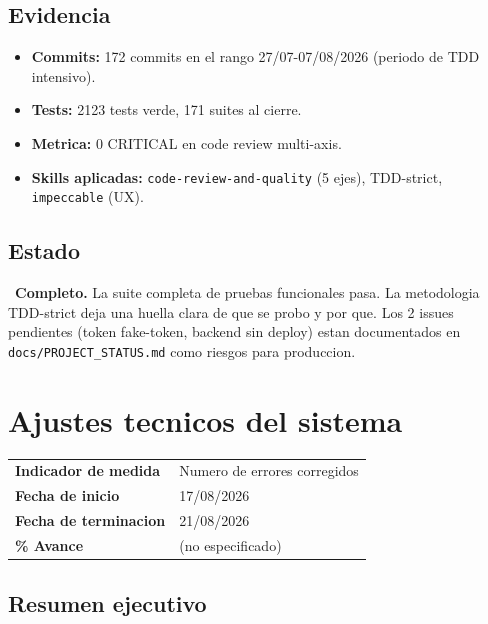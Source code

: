 \documentclass[11pt,a4paper,oneside]{report}
\begin{document}
\section{Evidencia}

\begin{itemize}[leftmargin=*]
    \item \textbf{Commits:} 172 commits en el rango 27/07-07/08/2026 (periodo de TDD intensivo).
    \item \textbf{Tests:} 2123 tests verde, 171 suites al cierre.
    \item \textbf{Metrica:} 0 CRITICAL en code review multi-axis.
    \item \textbf{Skills aplicadas:} \texttt{code-review-and-quality} (5 ejes), TDD-strict, \texttt{impeccable} (UX).
\end{itemize}

\section{Estado}

\checkmark\ \textbf{Completo.} La suite completa de pruebas funcionales pasa. La metodologia TDD-strict deja una huella clara de que se probo y por que. Los 2 issues pendientes (token fake-token, backend sin deploy) estan documentados en \texttt{docs/PROJECT\_STATUS.md} como riesgos para produccion.


\chapter{Ajustes tecnicos del sistema}

\begin{tabularx}{\textwidth}{L{4cm} X}
\toprule
\textbf{Indicador de medida} & Numero de errores corregidos \\
\textbf{Fecha de inicio} & 17/08/2026 \\
\textbf{Fecha de terminacion} & 21/08/2026 \\
\textbf{\% Avance} & (no especificado) \\
\bottomrule
\end{tabularx}

\section{Resumen ejecutivo}
\end{document}
